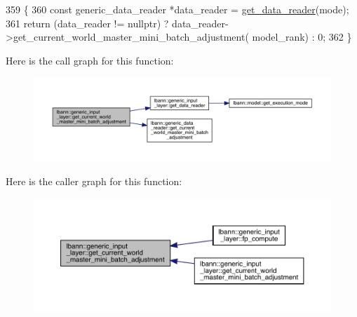 \begin{DoxyCode}
359                                                                                                         \{
360     \textcolor{keyword}{const} generic\_data\_reader *data\_reader = \hyperlink{classlbann_1_1generic__input__layer_aba732becdb02627e3ad4493ac19e8fb6}{get\_data\_reader}(mode);
361     \textcolor{keywordflow}{return} (data\_reader != \textcolor{keyword}{nullptr}) ? data\_reader->get\_current\_world\_master\_mini\_batch\_adjustment(
      model\_rank) : 0;
362   \}
\end{DoxyCode}
Here is the call graph for this function\+:\nopagebreak
\begin{figure}[H]
\begin{center}
\leavevmode
\includegraphics[width=350pt]{classlbann_1_1generic__input__layer_a8c3bf45beb91622d56f0dec89cba8e9a_cgraph}
\end{center}
\end{figure}
Here is the caller graph for this function\+:\nopagebreak
\begin{figure}[H]
\begin{center}
\leavevmode
\includegraphics[width=350pt]{classlbann_1_1generic__input__layer_a8c3bf45beb91622d56f0dec89cba8e9a_icgraph}
\end{center}
\end{figure}
\mbox{\label{classlbann_1_1generic__input__layer_a6c14ea2a50c7e7989e8e394671e4531a}} 

